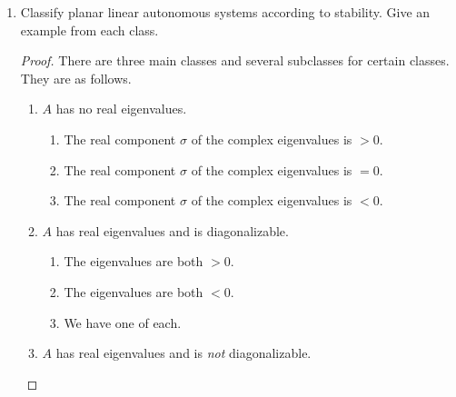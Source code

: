 \documentclass[../psets.tex]{subfiles}
\begin{document}
\begin{enumerate}
\begin{proof}
        where $e_n$ is the $n^\text{th}$ standard basis vector of $\R^n$ and $f(t)$ is still a scalar function. Then by the same derivation as in part (2) of this section, we end up with
        \begin{equation*}
            y(t) = \e[tA]y_0+\int_0^t\e[(t-\tau)A]e_ng(\tau)\dd\tau
        \end{equation*}
        Note that $\e[t'A]e_n$ is the solution to the IVP $u'=Au$ with $u(0)=e_n$. Thus, letting $U(t')$ denote the solution to the homogeneous equation with initial conditions $U(0)=U'(0)=\cdots=U^{(n-2)}(0)=0$ and $U^{(n-1)}(0)=1$ and knowing that $\e[tA]y_0$ is a solution to the homogeneous form of the above matrix equation, we can substitute to yield
        \begin{equation*}
            y(t) = y_h(t)+\int_0^tU(t-\tau)g(\tau)\dd\tau
        \end{equation*}
        as our final answer.
    \end{proof}
    \item Classify planar linear autonomous systems according to stability. Give an example from each class.
    \begin{proof}
        There are three main classes and several subclasses for certain classes. They are as follows.
        \begin{enumerate}
            \item $A$ has no real eigenvalues.
            \begin{enumerate}
                \item The real component $\sigma$ of the complex eigenvalues is $>0$.
                \item The real component $\sigma$ of the complex eigenvalues is $=0$.
                \item The real component $\sigma$ of the complex eigenvalues is $<0$.
            \end{enumerate}
            \item $A$ has real eigenvalues and is diagonalizable.
            \begin{enumerate}
                \item The eigenvalues are both $>0$.
                \item The eigenvalues are both $<0$.
                \item We have one of each.
            \end{enumerate}
            \item $A$ has real eigenvalues and is \emph{not} diagonalizable.

\end{enumerate}
\end{proof}
\end{enumerate}
\end{document}
